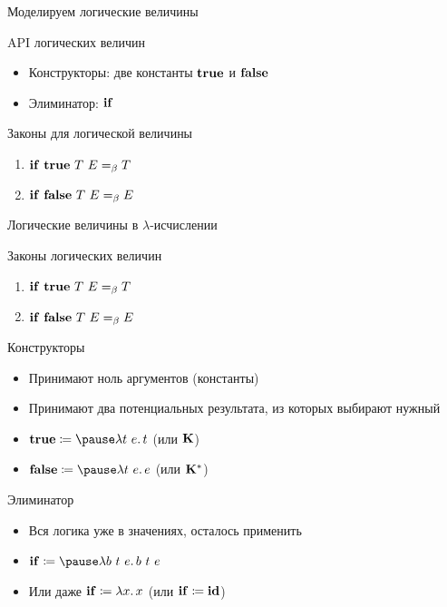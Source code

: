     \begin{frame}{Моделируем логические величины}
        \pause
        \begin{block}{API логических величин}
            \begin{itemize}
                \item Конструкторы: две константы $\mathbf{true}$ и $\mathbf{false}$
                \item Элиминатор: $\mathbf{if}$
            \end{itemize}
        \end{block}
        \pause
        \begin{block}{Законы для логической величины}
            \pause
            \begin{enumerate}
                \item $\mathbf{if} ~ \mathbf{true} ~ T ~ E =_\beta T$
                \item $\mathbf{if} ~ \mathbf{false} ~ T ~ E =_\beta E$
            \end{enumerate}
        \end{block}
    \end{frame}

    \begin{frame}{Логические величины в $\lambda$-исчислении}
        \begin{block}{Законы логических величин}
            \begin{enumerate}
                \item $\mathbf{if} ~ \mathbf{true} ~ T ~ E =_\beta T$
                \item $\mathbf{if} ~ \mathbf{false} ~ T ~ E =_\beta E$
            \end{enumerate}
        \end{block}
        \pause
        \begin{block}{Конструкторы}
            \begin{itemize}
                \item Принимают ноль аргументов (константы)
                \item Принимают два потенциальных результата, из которых выбирают нужный
                \item $\term{true} \termdef \pause \lambda t~e \ldotp t$ (или $\mathbf{K}$)
                \item $\term{false} \termdef \pause \lambda t~e \ldotp e$ (или $\mathbf{K}^*$)
            \end{itemize}
        \end{block}
        \pause
        \begin{block}{Элиминатор}
            \begin{itemize}
                \item Вся логика уже в значениях, осталось применить
                \item $\term{if} \termdef \pause \lambda b~t~e\ldotp b \ap t \ap e$
                \item Или даже $\mathbf{if} \coloneqq \lambda x \ldotp x$ (или $\mathbf{if} \coloneqq \mathbf{id}$)
            \end{itemize}
        \end{block}
    \end{frame}

